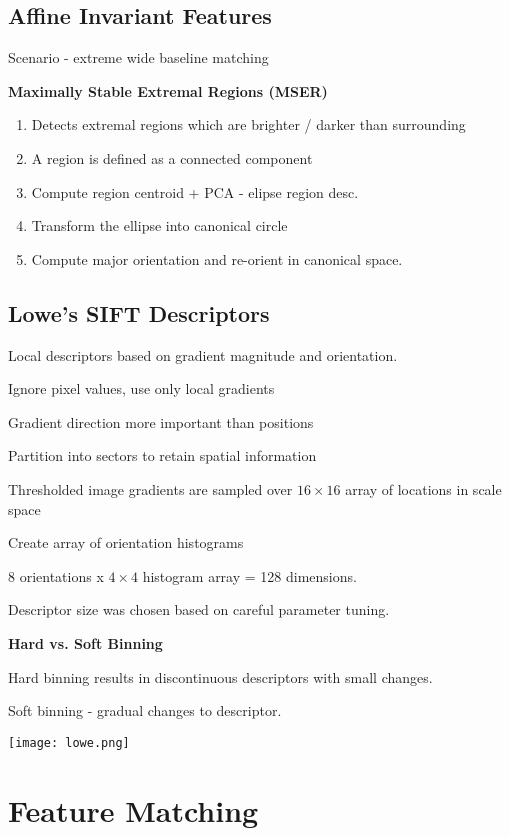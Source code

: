 \subsection{Affine Invariant Features}
Scenario - extreme wide baseline matching

\textbf{Maximally Stable Extremal Regions (MSER)}

\begin{enumerate}
\item Detects extremal regions which are brighter / darker than surrounding
\item A region is defined as a connected component
\item Compute region centroid + PCA - elipse region desc.
\item Transform the ellipse into canonical circle
\item Compute major orientation and re-orient in canonical space.
\end{enumerate}

\subsection{Lowe's SIFT Descriptors}

Local descriptors based on gradient magnitude and orientation.

Ignore pixel values, use only local gradients

Gradient direction more important than positions

Partition into sectors to retain spatial information

Thresholded image gradients are sampled over $16\times16$ array of locations in scale space

Create array of orientation histograms

8 orientations x $4\times4$ histogram array = 128 dimensions.

Descriptor size was chosen based on careful parameter tuning. 

\textbf{Hard vs. Soft Binning}

Hard binning results in discontinuous descriptors with small changes.

Soft binning - gradual changes to descriptor.

\texttt{[image: lowe.png]}

\section{Feature Matching}

